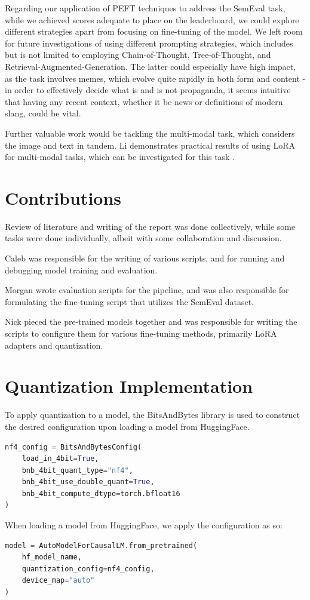 \documentclass[11pt]{article}
\begin{document}
Regarding our application of PEFT techniques to address the SemEval task, while we achieved scores adequate to place on the leaderboard, we could explore different strategies apart from focusing on fine-tuning of the model. We left room for future investigations of using different prompting strategies, which includes but is not limited to employing Chain-of-Thought, Tree-of-Thought, and Retrieval-Augmented-Generation. The latter could especially have high impact, as the task involves memes, which evolve quite rapidly in both form and content - in order to effectively decide what is and is not propaganda, it seems intuitive that having any recent context, whether it be news or definitions of modern slang, could be vital.

Further valuable work would be tackling the multi-modal task, which considers the image and text in tandem. Li demonstrates practical results of using LoRA for multi-modal tasks, which can be investigated for this task \cite{li2024instruction}.

\section{Contributions}

Review of literature and writing of the report was done collectively, while some tasks were done individually, albeit with some collaboration and discussion.

Caleb was responsible for the writing of various scripts, and for running and debugging model training and evaluation.

Morgan wrote evaluation scripts for the pipeline, and was also responsible for formulating the fine-tuning script that utilizes the SemEval dataset.

Nick pieced the pre-trained models together and was responsible for writing the scripts to configure them for various fine-tuning methods, primarily LoRA adapters and quantization.




\appendix

\section{Quantization Implementation}
\label{sec:appendix}
To apply quantization to a model, the BitsAndBytes library is used to construct the desired configuration upon loading a model from HuggingFace.

\begin{lstlisting}[language=Python, caption={NF4 Quantization Configuration}]
nf4_config = BitsAndBytesConfig(
	load_in_4bit=True,
	bnb_4bit_quant_type="nf4",
	bnb_4bit_use_double_quant=True,
	bnb_4bit_compute_dtype=torch.bfloat16
)
\end{lstlisting}

When loading a model from HuggingFace, we apply the configuration as so:

\begin{lstlisting}[language=Python, caption={Loading a Quantized Model}]
model = AutoModelForCausalLM.from_pretrained(
	hf_model_name,
	quantization_config=nf4_config,
	device_map="auto"
)
\end{lstlisting}
\end{document}
